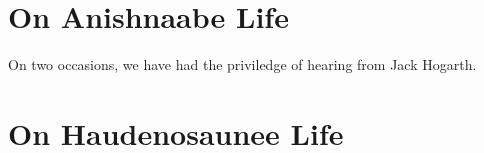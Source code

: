 \documentclass{report}
\begin{document}


\clearpage

\section{On Anishnaabe Life}

\hspace{24pt} On two occasions, we have had the priviledge of hearing from Jack Hogarth.

\clearpage

\section{On Haudenosaunee Life}


\clearpage

\printbibliography[heading=bibintoc]
\end{document}
